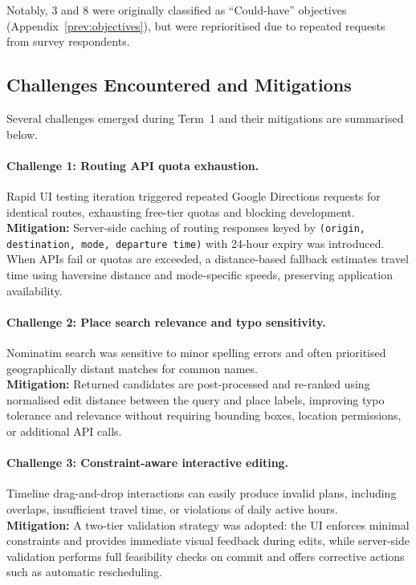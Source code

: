 Notably, 3 and 8 were originally classified as ``Could-have'' objectives (Appendix~\ref{prev:objectives}), but were reprioritised due to repeated requests from survey respondents.

\subsection{Challenges Encountered and Mitigations}
\label{sec:challenges}

Several challenges emerged during Term~1 and their mitigations are summarised below.

\paragraph{Challenge 1: Routing API quota exhaustion.}
Rapid UI testing iteration triggered repeated Google Directions requests for identical routes, exhausting free-tier quotas and blocking development.\\
\textbf{Mitigation:} Server-side caching of routing responses keyed by \texttt{(origin, destination, mode, departure time)} with 24-hour expiry was introduced. When APIs fail or quotas are exceeded, a distance-based fallback estimates travel time using haversine distance and mode-specific speeds, preserving application availability.

\paragraph{Challenge 2: Place search relevance and typo sensitivity.}
Nominatim search was sensitive to minor spelling errors and often prioritised geographically distant matches for common names.\\
\textbf{Mitigation:} Returned candidates are post-processed and re-ranked using normalised edit distance between the query and place labels, improving typo tolerance and relevance without requiring bounding boxes, location permissions, or additional API calls.

\paragraph{Challenge 3: Constraint-aware interactive editing.}
Timeline drag-and-drop interactions can easily produce invalid plans, including overlaps, insufficient travel time, or violations of daily active hours.\\
\textbf{Mitigation:} A two-tier validation strategy was adopted: the UI enforces minimal constraints and provides immediate visual feedback during edits, while server-side validation performs full feasibility checks on commit and offers corrective actions such as automatic rescheduling.

